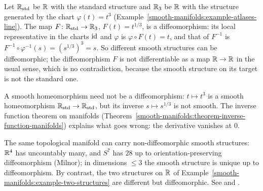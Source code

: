 \begin{example}\label{smooth-manifolds:example-two-structures}
Let $\mathbb{R}_{\mathrm{std}}$ be $\mathbb{R}$ with the standard structure and $\mathbb{R}_3$ be $\mathbb{R}$ with the structure generated by the chart $\varphi(t) = t^3$
(Example~\ref{smooth-manifolds:example-atlases-line}). The map $F \colon \mathbb{R}_{\mathrm{std}} \to \mathbb{R}_3$, $F(t) = t^{1/3}$, is a diffeomorphism: its local
representative in the charts $\mathrm{id}$ and $\varphi$ is $\varphi \circ F(t) = t$, and that of $F^{-1}$ is $F^{-1} \circ \varphi^{-1}(s) = (s^{1/3})^3 = s$. So
different smooth structures can be diffeomorphic; the diffeomorphism $F$ is not differentiable as a map $\mathbb{R} \to \mathbb{R}$ in the usual sense, which is no
contradiction, because the smooth structure on its target is not the standard one.
\end{example}

\begin{counterexample}\label{smooth-manifolds:counterexample-smooth-homeomorphism}
A smooth homeomorphism need not be a diffeomorphism: $t \mapsto t^3$ is a smooth homeomorphism $\mathbb{R}_{\mathrm{std}} \to \mathbb{R}_{\mathrm{std}}$, but its inverse
$s \mapsto s^{1/3}$ is not smooth. The inverse function theorem on manifolds
(Theorem~\ref{smooth-manifolds:theorem-inverse-function-manifolds}) explains what goes wrong: the derivative vanishes at $0$.
\end{counterexample}

\begin{counterexample}\label{smooth-manifolds:counterexample-exotic}
The same topological manifold can carry non-diffeomorphic smooth structures: $\mathbb{R}^4$ has uncountably many, and $S^7$ has $28$ up to orientation-preserving
diffeomorphism (Milnor); in dimensions $\leq 3$ the smooth structure is unique up to diffeomorphism. By contrast, the two structures on $\mathbb{R}$ of
Example~\ref{smooth-manifolds:example-two-structures} are different but diffeomorphic. See \cite{hirsch-differential-topology} and
\cite{milnor-differential-viewpoint}.
\end{counterexample}

